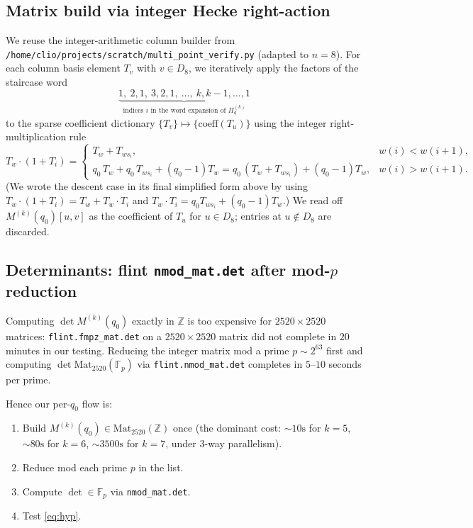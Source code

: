 \documentclass[11pt]{article}
\theoremstyle{definition}
\begin{document}
\subsection{Matrix build via integer Hecke right-action}

We reuse the integer-arithmetic column builder from \texttt{/home/clio/projects/scratch/multi\_point\_verify.py} (adapted to $n=8$). For each column basis element $T_v$ with $v \in D_8$, we iteratively apply the factors of the staircase word
\[
\underbrace{1,\ 2, 1,\ 3, 2, 1,\ \ldots,\ k, k-1, \ldots, 1}_{\text{indices } i \text{ in the word expansion of } \Pi^{(k)}_q}
\]
to the sparse coefficient dictionary $\{T_v\} \mapsto \{\text{coeff}(T_u)\}$ using the integer right-multiplication rule
\[
T_w \cdot (1 + T_i) =
\begin{cases}
T_w + T_{ws_i}, & w(i) < w(i+1), \\
q_0\, T_w + q_0\, T_{ws_i} + (q_0 - 1) T_w = q_0\,(T_w + T_{ws_i}) + (q_0 - 1) T_w, & w(i) > w(i+1).
\end{cases}
\]
(We wrote the descent case in its final simplified form above by using $T_w \cdot (1+T_i) = T_w + T_w \cdot T_i$ and $T_w \cdot T_i = q_0 T_{ws_i} + (q_0-1) T_w$.)  We read off $M^{(k)}(q_0)[u, v]$ as the coefficient of $T_u$ for $u \in D_8$; entries at $u \notin D_8$ are discarded.

\subsection{Determinants: flint \texttt{nmod\_mat.det} after mod-$p$ reduction}

Computing $\det M^{(k)}(q_0)$ exactly in $\mathbb{Z}$ is too expensive for $2520 \times 2520$ matrices: \texttt{flint.fmpz\_mat.det} on a $2520 \times 2520$ matrix did not complete in $20$ minutes in our testing. Reducing the integer matrix mod a prime $p \sim 2^{63}$ first and computing $\det \mathrm{Mat}_{2520}(\mathbb{F}_p)$ via \texttt{flint.nmod\_mat.det} completes in $5\text{--}10$ seconds per prime.

Hence our per-$q_0$ flow is:
\begin{enumerate}
\item Build $M^{(k)}(q_0) \in \mathrm{Mat}_{2520}(\mathbb{Z})$ once (the dominant cost: $\sim 10\text{s}$ for $k=5$, $\sim 80\text{s}$ for $k=6$, $\sim 3500\text{s}$ for $k=7$, under $3$-way parallelism).
\item Reduce mod each prime $p$ in the list.
\item Compute $\det \in \mathbb{F}_p$ via \texttt{nmod\_mat.det}.
\item Test \eqref{eq:hyp}.
\end{enumerate}
\end{document}
